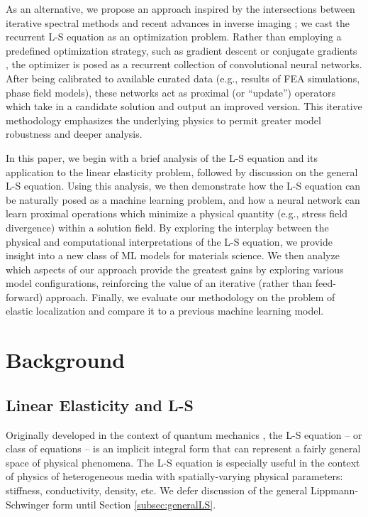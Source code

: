\documentclass[3p, preprint]{elsarticle}
\newenvironment{revision} {} {}
\begin{document}
As an alternative, we propose an approach inspired by the intersections between iterative spectral methods \cite{lebensohn2020} and recent advances in inverse imaging \cite{adler2018, putzky2017}; we cast the recurrent L-S equation as an optimization problem. Rather than employing a predefined optimization strategy, such as gradient descent or conjugate gradients \cite{Stein1952GradientMI}, the optimizer is posed as a recurrent collection of convolutional neural networks. After being calibrated to available curated data (e.g., results of FEA simulations, phase field models), these networks act as proximal (or ``update'') operators which take in a candidate solution and output an improved version. This iterative methodology emphasizes the underlying physics to permit greater model robustness and deeper analysis. 

In this paper, we begin with a brief analysis of the L-S equation and its application to the linear elasticity problem\begin{revision}, followed by discussion on the general L-S equation\end{revision}. Using this analysis, we then demonstrate how the L-S equation can be naturally posed as a machine learning problem, and how a neural network can learn proximal operations which minimize a physical quantity (e.g., stress field divergence) within a solution field. By exploring the interplay between the physical and computational interpretations of the L-S equation, we provide insight into a new class of ML models for materials science. We then analyze which aspects of our approach provide the greatest gains by exploring various model configurations, reinforcing the value of an iterative (rather than feed-forward) approach. Finally, we evaluate our methodology on the problem of elastic localization and compare it to a previous machine learning model.

\section{Background} \label{sec:background}

\subsection{Linear Elasticity and L-S}\label{subsec:ElasticBackground}

Originally developed in the context of quantum mechanics \cite{lippmannschwinger}, the L-S equation -- or class of equations -- is an implicit integral form that can represent a fairly general space of physical phenomena. The L-S equation is especially useful in the context of physics of heterogeneous media with spatially-varying physical parameters: stiffness, conductivity, density, etc. \begin{revision} We defer discussion of the general Lippmann-Schwinger form until Section \ref{subsec:generalLS}.\end{revision}
\end{document}
